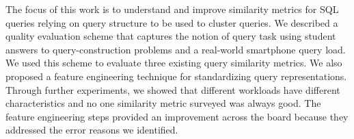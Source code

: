 The focus of this work is to understand and improve similarity metrics for SQL queries relying on query structure to be used to cluster queries. 
We described a quality evaluation scheme that captures the notion of query task using student answers to query-construction problems and a real-world smartphone query load.
We used this scheme to evaluate three existing query similarity metrics.
We also proposed a feature engineering technique for standardizing query representations.
Through further experiments, we showed that different workloads have different characteristics and no one similarity metric surveyed was always good. 
The feature engineering steps provided an improvement across the board because they addressed the error reasons we identified. %



